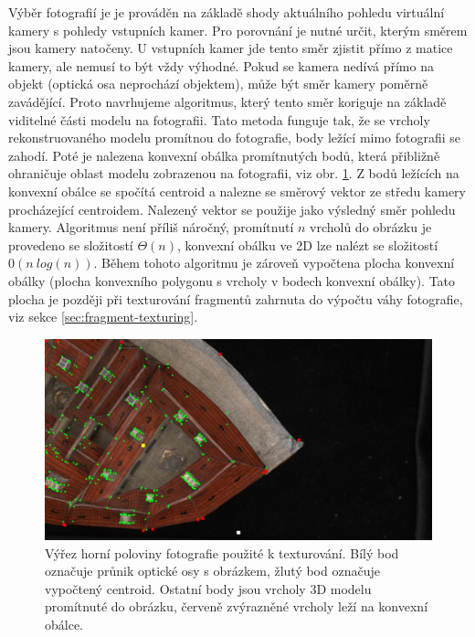 \documentclass[11pt,twoside,a4paper]{book}
\begin{document}
Výběr fotografií je je prováděn na základě shody aktuálního pohledu virtuální kamery s pohledy vstupních kamer. Pro porovnání je nutné určit, kterým směrem jsou kamery natočeny.  U vstupních kamer jde tento směr zjistit přímo z matice kamery, ale nemusí to být vždy výhodné. Pokud se kamera nedívá přímo na objekt (optická osa neprochází objektem), může být směr kamery poměrně zavádějící. Proto navrhujeme algoritmus, který tento směr koriguje na základě viditelné části modelu na fotografii. Tato metoda funguje tak, že se vrcholy rekonstruovaného modelu promítnou do fotografie, body ležící mimo fotografii se zahodí. Poté je nalezena konvexní obálka \cite{Andrew79} promítnutých bodů, která přibližně ohraničuje oblast modelu zobrazenou na fotografii, viz obr. \ref{fig:convex-hull}. Z bodů ležících na konvexní obálce se spočítá centroid a nalezne se směrový vektor ze středu kamery procházející centroidem. Nalezený vektor se použije jako výsledný směr pohledu kamery. Algoritmus není příliš náročný, promítnutí $n$ vrcholů do obrázku je provedeno se složitostí $\Theta(n)$, konvexní obálku ve 2D lze nalézt se složitostí $0(n~log(n))$. Během tohoto algoritmu je zároveň vypočtena plocha konvexní obálky (plocha konvexního polygonu s vrcholy v bodech konvexní obálky). Tato plocha je později při texturování fragmentů zahrnuta do výpočtu váhy fotografie, viz sekce \ref{sec:fragment-texturing}.

\begin{figure}[h]
\begin{center}
\includegraphics[width=\textwidth]{figures/0-0270_1020_110_09_00_000_098345e}
\caption{Výřez horní poloviny fotografie použité k texturování. Bílý bod označuje průnik optické osy s obrázkem, žlutý bod označuje vypočtený centroid. Ostatní body jsou vrcholy 3D modelu promítnuté do obrázku, červeně zvýrazněné vrcholy leží na konvexní obálce.}
\label{fig:convex-hull}
\end{center}
\end{figure}
 
\end{document}
